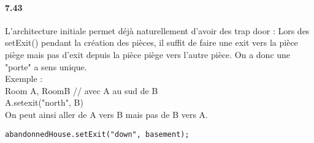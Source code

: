 \documentclass[11pt,a4paper]{report}
\begin{document}
\paragraph{7.43}
L'architecture initiale permet déjà naturellement d'avoir des trap door : Lors des setExit() pendant la création des pièces, il suffit de faire une exit vers la pièce piège mais pas d'exit depuis la pièce piège vers l'autre pièce. On a donc une "porte" a sens unique. \\
Exemple :\\
Room A, RoomB // avec A au sud de B\\
A.setexit("north", B)\\
On peut ainsi aller de A vers B mais pas de B vers A.
\begin{lstlisting}
abandonnedHouse.setExit("down", basement);
\end{lstlisting}
\end{document}
